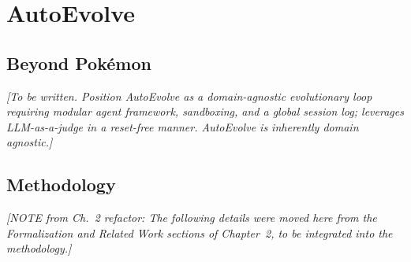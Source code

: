
\newpage
\section{AutoEvolve}\label{sec:autoevolve}

\subsection{Beyond Pok\'{e}mon}\label{sec:beyond_pokemon}


\textit{[To be written. Position AutoEvolve as a domain-agnostic evolutionary loop requiring modular agent framework, sandboxing, and a global session log; leverages LLM-as-a-judge in a reset-free manner. AutoEvolve is inherently domain agnostic.]}

\subsection{Methodology}\label{sec:methodology}

\textit{[NOTE from Ch.~2 refactor: The following details were moved here from the Formalization and Related Work sections of Chapter~2, to be integrated into the methodology.]}


